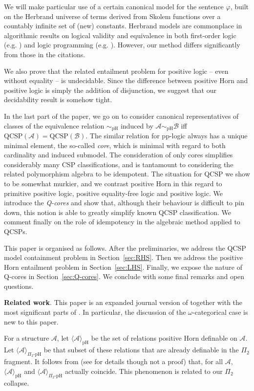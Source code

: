 \documentclass{LMCS}
\begin{document}
We will make particular use of a certain canonical model for the sentence $\varphi$, built on the Herbrand universe of terms derived from Skolem functions over a countably infinite set of (new) constants. Herbrand models are commonplace in algorithmic results on logical validity and equivalence in both first-order logic (e.g. \cite{Kozen81}) and logic programming (e.g. \cite{lifschitz01strongly,EiterFTW07,EiterFW07}). However, our method differs significantly from those in the citations.

We also prove that the related entailment problem for positive logic -- even without equality -- is undecidable. Since the difference between positive Horn and positive logic is simply the addition of disjunction, we suggest that our decidability result is somehow tight.

In the last part of the paper, we go on to consider canonical representatives of classes of the equivalence relation $\sim_{\mathrm{pH}}$ induced by $\mathcal{A} \sim_{\mathrm{pH}} \mathcal{B}$ iff  $\mathrm{QCSP}(\mathcal{A}) = \mathrm{QCSP}(\mathcal{B})$. The similar relation for pp-logic always has a unique minimal element, the so-called \emph{core}, which is minimal with regard to both cardinality and induced submodel. The consideration of only cores simplifies considerably many CSP classifications, and is tantamount to considering the related polymorphism algebra to be idempotent. The situation for QCSP we show to be somewhat murkier, and we contrast positive Horn in this regard to primitive positive logic, positive equality-free logic and positive logic. We introduce the \emph{Q-cores} and show that, although their behaviour is difficult to pin down, this notion is able to greatly simplify known QCSP classification. We comment finally on the role of idempotency in the algebraic method applied to QCSPs.

This paper is organised as follows. After the preliminaries, we address the QCSP model containment problem in Section~\ref{sec:RHS}. Then we address the positive Horn entailment problem in Section~\ref{sec:LHS}. Finally, we expose the nature of Q-cores in Section~\ref{sec:Q-cores}. We conclude with some final remarks and open questions.

\textbf{Related work}. This paper is an expanded journal version of \cite{LICS2008} together with the most significant parts of \cite{QCores}. In particular, the discussion of the $\omega$-categorical case is new to this paper.

For a structure $\mathcal{A}$, let $\langle \mathcal{A} \rangle_{\mathrm{pH}}$ be the set of relations positive Horn definable on $\mathcal{A}$. Let $\langle \mathcal{A} \rangle_{\Pi_2\mbox{-}\mathrm{pH}}$ be that subset of these relations that are already definable in the $\Pi_2$ fragment. It follows from \cite{OxfordAndHubie} (see \cite{HubieSIGACT} for details though not a proof) that, for all $\mathcal{A}$,  $\langle \mathcal{A} \rangle_{\mathrm{pH}}$ and  $\langle \mathcal{A} \rangle_{\Pi_2\mbox{-}\mathrm{pH}}$ actually coincide. This phenomenon is related to our $\Pi_2$ collapse.
\end{document}
